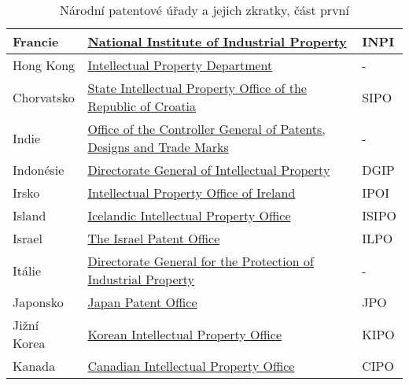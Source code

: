 \begin{table}[h!]
\begin{tabular}{|>{\centering\arraybackslash}p{2.2cm}|>{\centering\arraybackslash}p{8cm}|>{\centering\arraybackslash}p{2cm}|}
	\hline
	Francie & \href{http://www.inpi.fr/}{National Institute of Industrial Property}  & INPI         \\ 
	\hline
	Hong Kong & \href{https://www.ipd.gov.hk/index.htm}{Intellectual Property Department}  & -         \\ 
	\hline
	Chorvatsko & \href{https://www.dziv.hr/}{State Intellectual Property Office of the Republic of Croatia}  & SIPO         \\ 
	\hline
	Indie & \href{http://www.ipindia.nic.in/}{Office of the Controller General of Patents, Designs and Trade Marks}  & -         \\ 
	\hline
	Indonésie & \href{http://www.dgip.go.id/}{Directorate General of Intellectual Property}  & DGIP         \\ 
	\hline
	Irsko & \href{https://www.ipoi.gov.ie/en/}{Intellectual Property Office of Ireland}  & IPOI         \\ 
	\hline
	Island & \href{https://www.isipo.is/}{Icelandic Intellectual Property Office}  & ISIPO         \\ 
	\hline
	Israel & \href{https://www.gov.il/en/departments/ilpo}{The Israel Patent Office}  & ILPO         \\ 
	\hline
	Itálie & \href{https://uibm.mise.gov.it/index.php/it/}{Directorate General for the Protection of Industrial Property}  & -         \\ 
	\hline
	Japonsko & \href{https://www.jpo.go.jp/e/index.html}{Japan Patent Office}  & JPO         \\ 
	\hline
	Jižní Korea & \href{http://www.kipo.go.kr/}{Korean Intellectual Property Office}  & KIPO         \\ 
	\hline	
	Kanada & \href{https://www.ic.gc.ca/}{Canadian Intellectual Property Office}  & CIPO         \\ 
	\hline
	\end{tabular}
	\caption{Národní patentové úřady a jejich zkratky, část první}
	\label{tab:table_offices1}
	\end{table}

\newpage

